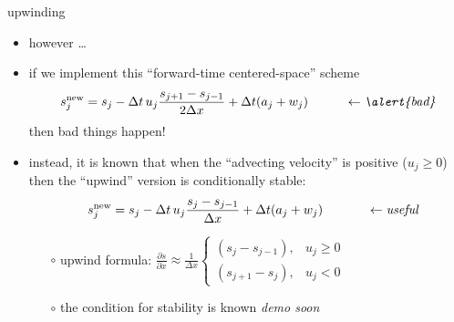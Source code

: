 \documentclass[10pt,dvipsnames]{beamer}
\newcommand{\snew}{s^{\text{new}}}
\newcommand{\comm}[1]{{\footnotesize \hfill \emph{#1}}}
\begin{document}
\begin{frame}{upwinding}

\begin{itemize}
\item \alert{however \dots}
\item if we implement this ``forward-time centered-space'' scheme
	$$\snew_j = s_j - \Delta t\, u_j \frac{s_{j+1}-s_{j-1}}{2\Delta x} + \Delta t (a_j + w_j) \hspace{1.0cm} \leftarrow \text{\emph{\alert{bad}}}$$
then bad things happen!
\item instead, it is known that when the ``advecting velocity'' is positive ($u_j \ge 0$) then the ``upwind'' version is conditionally stable:
	$$\hspace{3mm} \snew_j = s_j - \Delta t\, u_j \frac{s_j-s_{j-1}}{\Delta x} + \Delta t (a_j + w_j) \hfill \hspace{1.2cm} \leftarrow \text{\emph{useful}}$$

    \begin{itemize}
    \item[$\circ$] upwind formula: \quad $\displaystyle \frac{\partial s}{\partial x} \approx \frac{1}{\Delta x} \begin{cases} (s_j-s_{j-1}), & u_j \ge 0 \\ (s_{j+1}-s_j), & u_j < 0 \end{cases}$
    \item[$\circ$] the condition for stability is known \comm{demo soon}
    \end{itemize}
\end{itemize}
\end{frame}
\end{document}
